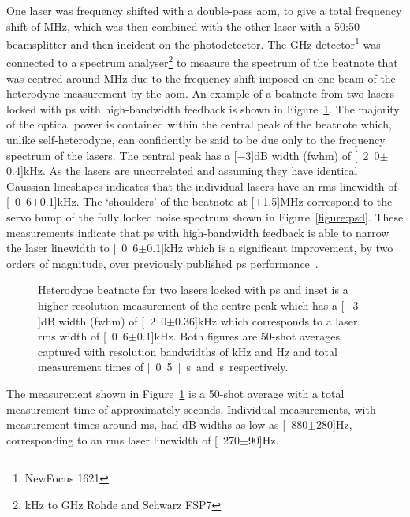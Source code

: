One laser was frequency shifted with a double-pass \gls{aom}, to give a total frequency shift of \unit[160]{MHz}, which was then combined with the other laser with a 50:50 beamsplitter and then incident on the photodetector.
The \unit[1]{GHz} detector\footnote{NewFocus 1621} was connected to a spectrum analyser\footnote{\unit[9]{kHz} to \unit[7]{GHz} Rohde and Schwarz FSP7} to measure the spectrum of the beatnote that was centred around \unit[160]{MHz} due to the frequency shift imposed on one beam of the heterodyne measurement by the \gls{aom}.
An example of a beatnote from two lasers locked with \gls{ps} with high-bandwidth feedback is shown in Figure~\ref{figure:two_laser_beatnote}.
The majority of the optical power is contained within the central peak of the beatnote which, unlike self-heterodyne, can confidently be said to be due only to the frequency spectrum of the lasers.
The central peak has a \unit[$-3$]{dB} width (\gls{fwhm}) of \unit[2.0$\pm$0.4]{kHz}.
As the lasers are uncorrelated and assuming they have identical Gaussian lineshapes indicates that the individual lasers have an \gls{rms} linewidth of \unit[0.6$\pm$0.1]{kHz}.
The `shoulders' of the beatnote at \unit[$\pm$1.5]{MHz} correspond to the servo bump of the fully locked noise spectrum shown in Figure~\ref{figure:psd}.
These measurements indicate that \gls{ps} with high-bandwidth feedback is able to narrow the laser linewidth to \unit[0.6$\pm$0.1]{kHz} which is a significant improvement, by two orders of magnitude, over previously published \gls{ps} performance~\cite{torii_laser-phase_2012}.

\begin{figure}
\center

\caption[Heterodyne beatnote for two external cavity diode lasers locked with high-bandwidth polarisation spectroscopy.]{Heterodyne beatnote for two lasers locked with \gls{ps} and inset is a higher resolution measurement of the centre peak which has a \unit[$-3$]{dB} width (\gls{fwhm}) of \unit[2.0$\pm$0.36]{kHz} which corresponds to a laser \gls{rms} width of \unit[0.6$\pm$0.1]{kHz}.
Both figures are 50-shot averages captured with resolution bandwidths of \unit[30]{kHz} and \unit[100]{Hz} and total measurement times of \unit[0.5]{s} and \unit[2]{s} respectively.}
\label{figure:two_laser_beatnote}
\end{figure}

The measurement shown in Figure~\ref{figure:two_laser_beatnote} is a 50-shot average with a total measurement time of approximately \unit[2]{seconds}.
Individual measurements, with measurement times around \unit[40]{ms}, had \unit[-3]{dB} widths as low as \unit[880$\pm$280]{Hz}, corresponding to an \gls{rms} laser linewidth of \unit[270$\pm$90]{Hz}.

